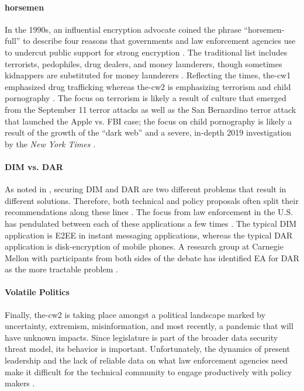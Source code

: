 \paragraph*{\Ac{horsemen}} In the 1990s, an influential encryption advocate coined the phrase ``\ac{horsemen-full}'' to
describe four reasons that governments and law enforcement agencies use to undercut public support for strong encryption
\cite{may_1994}. The traditional list includes terrorists, pedophiles, drug dealers, and money launderers, though
sometimes kidnappers are substituted for money launderers \cite{schneier_scaring_2019}. Reflecting the times,
\ac{the-cw1} emphasized drug trafficking whereas \ac{the-cw2} is emphasizing terrorism and child pornography
\cite{schulze_clipper_2017}. The focus on terrorism is likely a result of culture that emerged from the September 11
terror attacks as well as the San Bernardino terror attack that launched the Apple vs. \ac{FBI} case; the focus on child
pornography is likely a result of the growth of the ``dark web'' and a severe, in-depth 2019 investigation by the
\textit{New York Times} \cite{keller_internet_2019}.

\paragraph*{\ac{DIM} vs. \ac{DAR}} As noted in , securing \acl{DIM} and \acl{DAR} are two
different problems that result in different solutions. Therefore, both technical and policy proposals often split their
recommendations along these lines \cite{group_2019} \cite{owen_law_2018}. The focus from law enforcement in the U.S. has
pendulated between each of these applications a few times \cite{schneier_2019}. The typical \ac{DIM} application is
\ac{E2EE} in instant messaging applications, whereas the typical \ac{DAR} application is \ac{disk-encryption} of mobile
phones. A research group at Carnegie Mellon with participants from both sides of the debate has identified \ac{EA} for
\ac{DAR} as the more tractable problem \cite{group_2019}.

\paragraph*{Volatile Politics} Finally, \ac{the-cw2} is taking place amongst a political landscape marked by
uncertainty, extremism, misinformation, and most recently, a pandemic that will have unknown impacts. Since legislature
is part of the broader data security threat model, its behavior is important. Unfortunately, the dynamics of present
leadership and the lack of reliable data on what law enforcement agencies need make it difficult for the technical
community to engage productively with policy makers \cite{granick_2018}.

